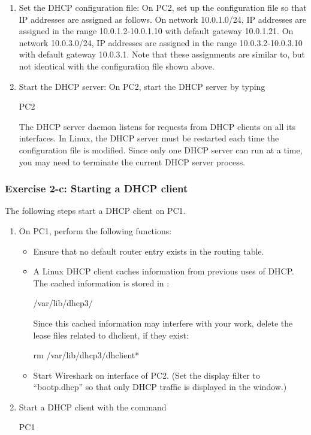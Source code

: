 \begin{enumerate}
	\item Set the DHCP configuration file: On PC2, set up the configuration file so that IP addresses are assigned as follows. On network 10.0.1.0/24, IP addresses are assigned in the range 10.0.1.2-10.0.1.10 with default gateway 10.0.1.21. On network 10.0.3.0/24, IP addresses are assigned in the range 10.0.3.2-10.0.3.10 with default gateway 10.0.3.1.
Note that these assignments are similar to, but not identical with the configuration file shown above.
	\item Start the DHCP server: On PC2, start the DHCP server by typing 
		\begin{cmdblock}
	PC2%
		\end{cmdblock}
		The DHCP server daemon listens for requests from DHCP clients on all its interfaces. In Linux, the DHCP server must be restarted each time the configuration file is modified. Since only one DHCP server can run at a time, you may need to terminate the current DHCP server process.
\end{enumerate}

\subsubsection{Exercise 2-c: Starting a DHCP client}

The following steps start a DHCP client on PC1.
\begin{enumerate}
	\item On PC1, perform the following functions:
		\begin{itemize}
			\item Ensure that no default router entry exists in the routing table.
			\item A Linux DHCP client caches information from previous uses of DHCP. The cached information is stored in :
				\begin{cmdblock}
	/var/lib/dhcp3/
				\end{cmdblock}
				Since this cached information may interfere with your work, delete the lease files related to dhclient, if they exist:
				\begin{cmdblock}
	rm /var/lib/dhcp3/dhclient*
				\end{cmdblock}
			\item Start Wireshark on interface  of PC2. (Set the display filter to ``bootp.dhcp'' so that only DHCP traffic is displayed in the window.)
		\end{itemize}
	\item Start a DHCP client with the command
		\begin{cmdblock}
	PC1%
		\end{cmdblock}
\end{enumerate}

